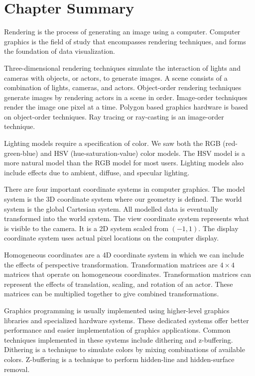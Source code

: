 \section{Chapter Summary}

Rendering is the process of generating an image using a computer. Computer graphics is the field of study that encompasses rendering techniques, and forms the foundation of data visualization.

Three-dimensional rendering techniques simulate the interaction of lights and cameras with objects, or actors, to generate images. A scene consists of a combination of lights, cameras, and actors. Object-order rendering techniques generate images by rendering actors in a scene in order. Image-order techniques render the image one pixel at a time. Polygon based graphics hardware is based on object-order techniques. Ray tracing or ray-casting is an image-order technique.

Lighting models require a specification of color. We saw both the RGB (red-green-blue) and HSV (hue-saturation-value) color models. The HSV model is a more natural model than the RGB model for most users. Lighting models also include effects due to ambient, diffuse, and specular lighting.

There are four important coordinate systems in computer graphics. The model system is the 3D coordinate system where our geometry is defined. The world system is the global Cartesian system. All modelled data is eventually transformed into the world system. The view coordinate system represents what is visible to the camera. It is a 2D system scaled from $(-1,1)$. The display coordinate system uses actual pixel locations on the computer display.

Homogeneous coordinates are a 4D coordinate system in which we can include the effects of perspective transformation. Transformation matrices are \(4 \times 4\) matrices that operate on homogeneous coordinates. Transformation matrices can represent the effects of translation, scaling, and rotation of an actor. These matrices can be multiplied together to give combined transformations.

Graphics programming is usually implemented using higher-level graphics libraries and specialized hardware systems. These dedicated systems offer better performance and easier implementation of graphics applications. Common techniques implemented in these systems include dithering and z-buffering. Dithering is a technique to simulate colors by mixing combinations of available colors. Z-buffering is a technique to perform hidden-line and hidden-surface removal.

